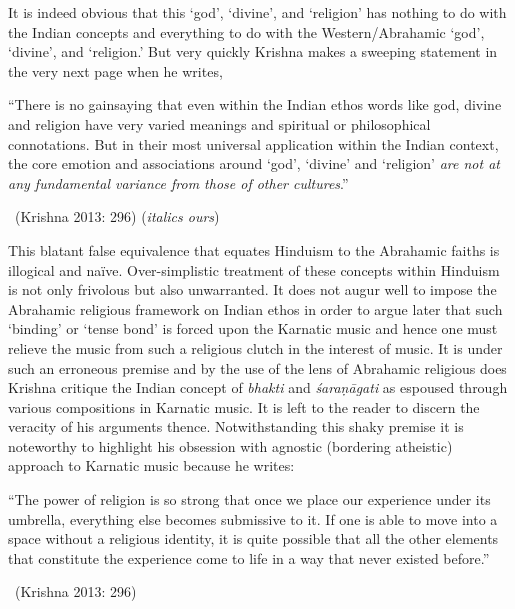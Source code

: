 \newpage

It is indeed obvious that this ‘god’, ‘divine’, and ‘religion’ has nothing to do with the Indian concepts and everything to do with the Western/Abrahamic ‘god’, ‘divine’, and ‘religion.’ But very quickly Krishna makes a sweeping statement in the very next page when he writes,

\begin{myquote}
“There is no gainsaying that even within the Indian ethos words like god, divine and religion have very varied meanings and spiritual or philosophical connotations. But in their most universal application within the Indian context, the core emotion and associations around ‘god’, ‘divine’ and ‘religion’ \textit{are not at any fundamental variance from those of other cultures}.” 

~\hfill (Krishna 2013: 296) (\textit{italics ours})
\end{myquote}

This blatant false equivalence that equates Hinduism to the Abrahamic faiths is illogical and naïve. Over-simplistic treatment of these concepts within Hinduism is not only frivolous but also unwarranted. It does not augur well to impose the Abrahamic religious framework on Indian ethos in order to argue later that such ‘binding’ or ‘tense bond’ is forced upon the Karnatic music and hence one must relieve the music from such a religious clutch in the interest of music. It is under such an erroneous premise and by the use of the lens of Abrahamic religious does Krishna critique the Indian concept of \textit{bhakti} and \textit{śaraṇāgati }as espoused through various compositions in Karnatic music. It is left to the reader to discern the veracity of his arguments thence. Notwithstanding this shaky premise it is noteworthy to highlight his obsession with agnostic (bordering atheistic) approach to Karnatic music because he writes:

\begin{myquote}
“The power of religion is so strong that once we place our experience under its umbrella, everything else becomes submissive to it. If one is able to move into a space without a religious identity, it is quite possible that all the other elements that constitute the experience come to life in a way that never existed before.” 

~\hfill (Krishna 2013: 296)
\end{myquote}

